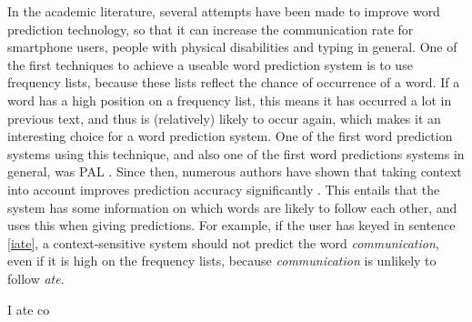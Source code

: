 \documentclass[12pt]{article}
\begin{document}
In the academic literature, several attempts have been made to improve word prediction technology, so that it can increase the communication rate for smartphone users, people with physical disabilities and typing in general. One of the first techniques to achieve a useable word prediction system is to use frequency lists, because these lists reflect the chance of occurrence of a word. If a word has a high position on a frequency list, this means it has occurred a lot in previous text, and thus is (relatively) likely to occur again, which makes it an interesting choice for a word prediction system. One of the first word prediction systems using this technique, and also one of the first word predictions systems in general, was PAL \cite{swiffin+85}. Since then, numerous authors have shown that taking context into account improves prediction accuracy significantly \cite[among others]{Lesher+99,Garay-Vitoria+06,Tanaka-Ishii07,vandenbosch+08}. This entails that the system has some information on which words are likely to follow each other, and uses this when giving predictions. For example, if the user has keyed in sentence \ref{iate}, a context-sensitive system should not predict the word \emph{communication}, even if it is high on the frequency lists, because \emph{communication} is unlikely to follow \emph{ate}.

\begin{examples}
\item I ate co \label{iate}
\end{examples}





\end{document}

